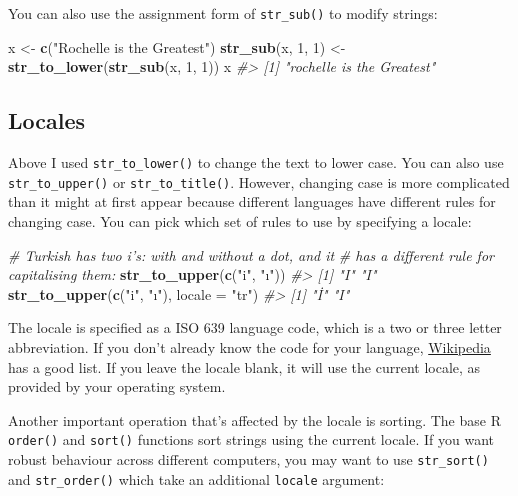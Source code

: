 \documentclass[]{book}
\newenvironment{Shaded}{\begin{snugshade}}{\end{snugshade}}
\newcommand{\CommentTok}[1]{\textcolor[rgb]{0.56,0.35,0.01}{\textit{#1}}}
\newcommand{\DataTypeTok}[1]{\textcolor[rgb]{0.13,0.29,0.53}{#1}}
\newcommand{\DecValTok}[1]{\textcolor[rgb]{0.00,0.00,0.81}{#1}}
\newcommand{\KeywordTok}[1]{\textcolor[rgb]{0.13,0.29,0.53}{\textbf{#1}}}
\newcommand{\NormalTok}[1]{#1}
\newcommand{\StringTok}[1]{\textcolor[rgb]{0.31,0.60,0.02}{#1}}
\begin{document}
You can also use the assignment form of \texttt{str\_sub()} to modify strings:

\begin{Shaded}
\begin{Highlighting}[]
\NormalTok{x <-}\StringTok{ }\KeywordTok{c}\NormalTok{(}\StringTok{"Rochelle is the Greatest"}\NormalTok{)}
\KeywordTok{str_sub}\NormalTok{(x, }\DecValTok{1}\NormalTok{, }\DecValTok{1}\NormalTok{) <-}\StringTok{ }\KeywordTok{str_to_lower}\NormalTok{(}\KeywordTok{str_sub}\NormalTok{(x, }\DecValTok{1}\NormalTok{, }\DecValTok{1}\NormalTok{))}
\NormalTok{x}
\CommentTok{#> [1] "rochelle is the Greatest"}
\end{Highlighting}
\end{Shaded}

\hypertarget{locales}{%
\subsection{Locales}\label{locales}}

Above I used \texttt{str\_to\_lower()} to change the text to lower case. You can also use \texttt{str\_to\_upper()} or \texttt{str\_to\_title()}. However, changing case is more complicated than it might at first appear because different languages have different rules for changing case. You can pick which set of rules to use by specifying a locale:

\begin{Shaded}
\begin{Highlighting}[]
\CommentTok{# Turkish has two i's: with and without a dot, and it}
\CommentTok{# has a different rule for capitalising them:}
\KeywordTok{str_to_upper}\NormalTok{(}\KeywordTok{c}\NormalTok{(}\StringTok{"i"}\NormalTok{, }\StringTok{"ı"}\NormalTok{))}
\CommentTok{#> [1] "I" "I"}
\KeywordTok{str_to_upper}\NormalTok{(}\KeywordTok{c}\NormalTok{(}\StringTok{"i"}\NormalTok{, }\StringTok{"ı"}\NormalTok{), }\DataTypeTok{locale =} \StringTok{"tr"}\NormalTok{)}
\CommentTok{#> [1] "İ" "I"}
\end{Highlighting}
\end{Shaded}

The locale is specified as a ISO 639 language code, which is a two or three letter abbreviation. If you don't already know the code for your language, \href{https://en.wikipedia.org/wiki/List_of_ISO_639-1_codes}{Wikipedia} has a good list. If you leave the locale blank, it will use the current locale, as provided by your operating system.

Another important operation that's affected by the locale is sorting. The base R \texttt{order()} and \texttt{sort()} functions sort strings using the current locale. If you want robust behaviour across different computers, you may want to use \texttt{str\_sort()} and \texttt{str\_order()} which take an additional \texttt{locale} argument:
\end{document}
